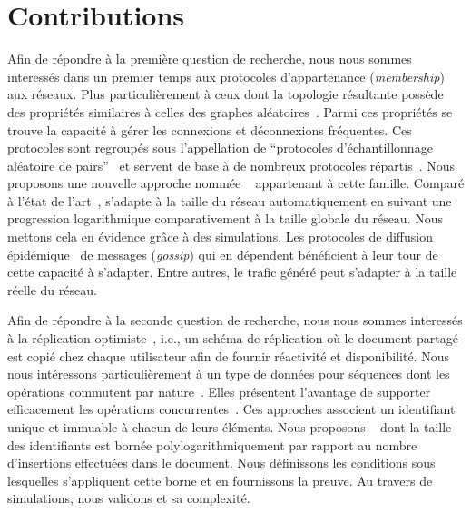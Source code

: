 
\section{Contributions}


Afin de répondre à la première question de recherche, nous nous sommes
interessés dans un premier temps aux protocoles d'appartenance
(\emph{membership}) aux réseaux. Plus particulièrement à ceux dont la topologie
résultante possède des propriétés similaires à celles des graphes
aléatoires~\cite{erdos1959random}. Parmi ces propriétés se trouve la capacité à
gérer les connexions et déconnexions fréquentes. Ces protocoles sont regroupés
sous l'appellation de ``protocoles d'échantillonnage aléatoire de
pairs''~\cite{jelasity2004peer, jelasity2007gossip} et servent de base à de
nombreux protocoles répartis~\cite{dabek2004vivaldi, folz2016cyclades,
  montresor2005chord}. Nous proposons une nouvelle approche nommée
\SPRAY~\cite{nedelec2015spray} appartenant à cette famille. Comparé à l'état de
l'art~\cite{eugster2003lightweight, ganesh2001scamp, jelasity2007gossip,
  leitao2007dependable, tolgyeski2009adaptive, voulgaris2005cyclon}, \SPRAY
s'adapte à la taille du réseau automatiquement en suivant une progression
logarithmique comparativement à la taille globale du réseau. Nous mettons cela
en évidence grâce à des simulations.  Les protocoles de diffusion
épidémique~\cite{birman1999bimodal} de messages (\emph{gossip}) qui en dépendent
bénéficient à leur tour de cette capacité à s'adapter. Entre autres, le trafic
généré peut s'adapter à la taille réelle du réseau.

Afin de répondre à la seconde question de recherche, nous nous sommes interessés
à la réplication optimiste~\cite{demers1987epidemic, saito2005optimistic}, i.e.,
un schéma de réplication où le document partagé est copié chez chaque
utilisateur afin de fournir réactivité et disponibilité. Nous nous intéressons
particulièrement à un type de données pour séquences dont les opérations
commutent par nature~\cite{burckhardt2014replicated, shapiro2011comprehensive,
  shapiro2011conflict, zawirski2015dependable}. Elles présentent l'avantage de
supporter efficacement les opérations concurrentes~\cite{ahmed2015evaluation,
  ahmed2011evaluating}. Ces approches associent un identifiant unique et
immuable à chacun de leurs éléments. Nous proposons
\LSEQ~\cite{nedelec2013concurrency, nedelec2013lseq} dont la taille des
identifiants est bornée polylogarithmiquement par rapport au nombre d'insertions
effectuées dans le document. Nous définissons les conditions sous lesquelles
s'appliquent cette borne et en fournissons la preuve. Au travers de simulations,
nous validons \LSEQ et sa complexité.

